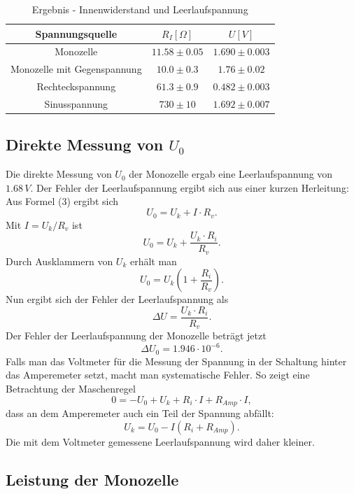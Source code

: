 \documentclass[11pt,ngerman,a4paper]{article}
\begin{document}
 \begin{table}[h]
 \centering
 \begin{tabular}{|c|c|c|}
  \hline
  Spannungsquelle & $R_I[\Omega]$ & $U[V]$ \\
  \hline
  Monozelle & $11.58\pm0.05$ & $1.690\pm0.003$ \\
  Monozelle mit Gegenspannung  & $10.0 \pm 0.3$ &$1.76\pm0.02$\\
  Rechteckspannung & $61.3\pm0.9$& $0.482\pm0.003$ \\
  Sinusspannung & $730\pm10$ & $1.692\pm0.007$\\
  \hline
 \end{tabular}
 \caption{Ergebnis - Innenwiderstand und Leerlaufspannung}
 \label{Ergebnis}
 \end{table}

\subsection{Direkte Messung von $U_0$}
Die direkte Messung von $U_0$ der Monozelle ergab eine Leerlaufspannung von $1.68\, V$. Der Fehler der Leerlaufspannung ergibt sich aus einer kurzen Herleitung:\newline
Aus Formel (3) ergibt sich
\[ U_0 = U_k + I \cdot R_v. \]
Mit $I=U_k / R_v$ ist
\[ U_0 = U_k + \frac{U_k \cdot R_i}{R_v}.\]
Durch Ausklammern von $U_k$ erhält man
\[ U_0 = U_k \left( 1+\frac{R_i}{R_v}\right) .\]
Nun ergibt sich der Fehler der Leerlaufspannung als
\[ \Delta U = \frac{U_k \cdot R_i}{R_v}. \]
Der Fehler der Leerlaufspannung der Monozelle beträgt jetzt
\[ \Delta U_0 = 1.946 \cdot 10^{-6}.\]
\newline
Falls man das Voltmeter für die Messung der Spannung in der Schaltung hinter das Amperemeter setzt, macht man systematische Fehler. So zeigt eine Betrachtung der Maschenregel
\[ 0 = -U_0 + U_k + R_i \cdot I + R_{Amp} \cdot I ,\]
dass an dem Amperemeter auch ein Teil der Spannung abfällt:
\[ U_k = U_0 - I(R_i + R_{Amp}). \]
\newline
Die mit dem Voltmeter gemessene Leerlaufspannung wird daher kleiner.
\subsection{Leistung der Monozelle}
\end{document}
